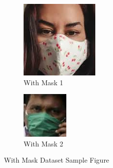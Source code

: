 \documentclass[conference]{IEEEtran}
\begin{document}
\begin{figure}[ht]
\begin{subfigure}{.5\textwidth}
  \centering
  \includegraphics[width=.3\linewidth]{WithMask/53.png}  
  \caption{With Mask 1}
  \label{fig:sub-first-wm}
\end{subfigure}
\begin{subfigure}{.5\textwidth}
  \centering
  \includegraphics[width=.3\linewidth]{WithMask/85.png}  
  \caption{With Mask 2}
  \label{fig:sub-second-wm}
\end{subfigure}
\caption{With Mask Dataset Sample Figure}
\label{fig:fig}
\end{figure}
\end{document}
